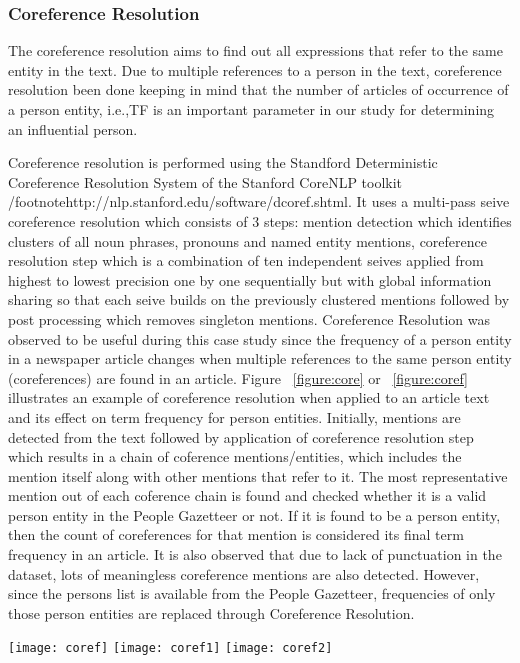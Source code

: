 \begin{enumerate}
\subsubsection{Coreference Resolution}
 The coreference resolution aims to find out all expressions that refer to the same entity in the text. Due to multiple references to a person in the text, coreference resolution been done keeping in mind that the number of articles of occurrence of a person entity, i.e.,TF is an important parameter in our study for determining an influential person.

Coreference resolution is performed using the Standford Deterministic Coreference Resolution System of the Stanford CoreNLP toolkit /footnote{http://nlp.stanford.edu/software/dcoref.shtml}. It uses a multi-pass seive coreference resolution\cite{lee2013deterministic} which consists of 3 steps: mention detection which identifies clusters of all noun phrases, pronouns and named entity mentions, coreference resolution step which is a combination of ten independent seives applied from highest to lowest precision one by one sequentially but with global information sharing so that each seive builds on the previously clustered mentions followed by post processing which removes singleton mentions.
Coreference Resolution was observed to be useful during this case study since the frequency of a person entity in a newspaper article changes when multiple references to the same person entity (coreferences) are found in an article. Figure ~\ref{figure:core} or ~\ref{figure:coref}  illustrates an example of coreference resolution when applied to an article text and its effect on term frequency for person entities. Initially, mentions are detected from the text followed by application of coreference resolution step which results in a chain of coference mentions/entities, which includes the mention itself along with other mentions that refer to it. The most representative mention out of each coference chain is found and checked whether it is a valid person entity in the People Gazetteer or not. If it is found to be a person entity, then the count of coreferences for that mention is considered its final term frequency in an article. 
It is also observed that due to lack of punctuation in the dataset, lots of meaningless coreference mentions are also detected. However, since the persons list is available from the People Gazetteer, frequencies of only those person entities are replaced through Coreference Resolution. 
\begin{figure*}
\begin{center}
\texttt{[image: coref]}
\texttt{[image: coref1]}
\texttt{[image: coref2]}
\end{center}
\caption{Figure illustrating change in term frequency for person named entities on using coreference resolution on an article text}
\label{figure:core}
\end{figure*}


\end{enumerate}
